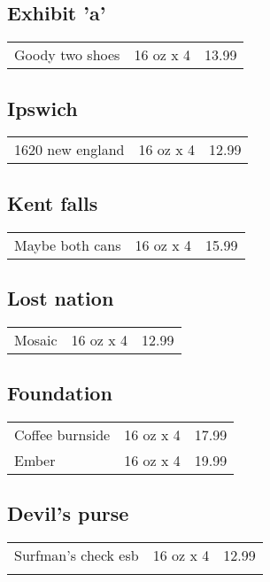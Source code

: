 \documentclass{article}%
\begin{document}
\begin{multicols}{3}
%
\subsection*{Exhibit 'a'}%
\begin{tabular}{l c r}%
Goody two shoes&16 oz x 4&13.99\\%
\end{tabular}

%
\subsection*{Ipswich}%
\begin{tabular}{l c r}%
1620 new england&16 oz x 4&12.99\\%
\end{tabular}

%
\subsection*{Kent falls}%
\begin{tabular}{l c r}%
Maybe both cans&16 oz x 4&15.99\\%
\end{tabular}

%
\subsection*{Lost nation}%
\begin{tabular}{l c r}%
Mosaic&16 oz x 4&12.99\\%
\end{tabular}

%
\subsection*{Foundation}%
\begin{tabular}{l c r}%
Coffee burnside&16 oz x 4&17.99\\%
Ember&16 oz x 4&19.99\\%
\end{tabular}

%
\subsection*{Devil's purse}%
\begin{tabular}{l c r}%
\multirow{1}{15ex}{Surfman's check esb}&16 oz x 4&12.99\\%
&&\\%
\end{tabular}


\end{multicols}
\end{document}
